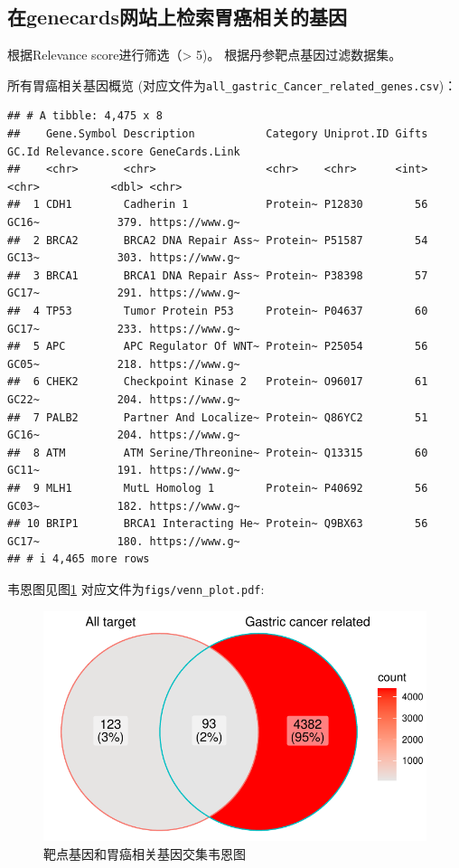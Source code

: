 \documentclass[
]{article}
\begin{document}
\hypertarget{ux5728genecardsux7f51ux7ad9ux4e0aux68c0ux7d22ux80c3ux764cux76f8ux5173ux7684ux57faux56e0}{%
\subsection{在genecards网站上检索胃癌相关的基因}\label{ux5728genecardsux7f51ux7ad9ux4e0aux68c0ux7d22ux80c3ux764cux76f8ux5173ux7684ux57faux56e0}}

根据Relevance score进行筛选（\textgreater{} 5)。
根据丹参靶点基因过滤数据集。

所有胃癌相关基因概览
(对应文件为\texttt{all\_gastric\_Cancer\_related\_genes.csv})：

\begin{verbatim}
## # A tibble: 4,475 x 8
##    Gene.Symbol Description           Category Uniprot.ID Gifts GC.Id Relevance.score GeneCards.Link
##    <chr>       <chr>                 <chr>    <chr>      <int> <chr>           <dbl> <chr>         
##  1 CDH1        Cadherin 1            Protein~ P12830        56 GC16~            379. https://www.g~
##  2 BRCA2       BRCA2 DNA Repair Ass~ Protein~ P51587        54 GC13~            303. https://www.g~
##  3 BRCA1       BRCA1 DNA Repair Ass~ Protein~ P38398        57 GC17~            291. https://www.g~
##  4 TP53        Tumor Protein P53     Protein~ P04637        60 GC17~            233. https://www.g~
##  5 APC         APC Regulator Of WNT~ Protein~ P25054        56 GC05~            218. https://www.g~
##  6 CHEK2       Checkpoint Kinase 2   Protein~ O96017        61 GC22~            204. https://www.g~
##  7 PALB2       Partner And Localize~ Protein~ Q86YC2        51 GC16~            204. https://www.g~
##  8 ATM         ATM Serine/Threonine~ Protein~ Q13315        60 GC11~            191. https://www.g~
##  9 MLH1        MutL Homolog 1        Protein~ P40692        56 GC03~            182. https://www.g~
## 10 BRIP1       BRCA1 Interacting He~ Protein~ Q9BX63        56 GC17~            180. https://www.g~
## # i 4,465 more rows
\end{verbatim}

韦恩图见图\ref{fig:fig2}
对应文件为\texttt{figs/venn\_plot.pdf}:

\begin{figure}
\centering
\includegraphics{figs/venn_plot.pdf}
\caption{\label{fig:fig2}靶点基因和胃癌相关基因交集韦恩图}
\end{figure}
\end{document}

